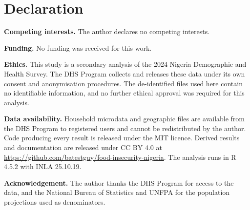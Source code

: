 \section{Declaration}

\noindent\textbf{Competing interests.} The author declares no competing interests.

\medskip
\noindent\textbf{Funding.} No funding was received for this work.

\medskip
\noindent\textbf{Ethics.} This study is a secondary analysis of the 2024 Nigeria Demographic and Health Survey. The DHS Program collects and releases these data under its own consent and anonymisation procedures. The de-identified files used here contain no identifiable information, and no further ethical approval was required for this analysis.

\medskip
\noindent\textbf{Data availability.} Household microdata and geographic files are available from the DHS Program to registered users and cannot be redistributed by the author. Code producing every result is released under the MIT licence. Derived results and documentation are released under CC BY 4.0 at \url{https://github.com/batestguy/food-insecurity-nigeria}. The analysis runs in R 4.5.2 with INLA 25.10.19.

\medskip
\noindent\textbf{Acknowledgement.} The author thanks the DHS Program for access to the data, and the National Bureau of Statistics and UNFPA for the population projections used as denominators.
